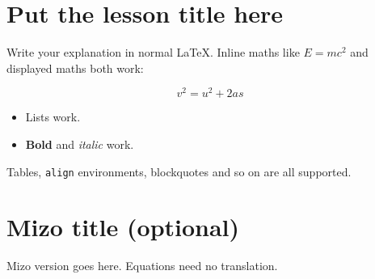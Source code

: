%
%
%
%
%

\section*{Put the lesson title here}

Write your explanation in normal LaTeX. Inline maths like $E = mc^{2}$ and
displayed maths both work:

\begin{equation}
  v^{2} = u^{2} + 2 a s
\end{equation}

\begin{itemize}
  \item Lists work.
  \item \textbf{Bold} and \emph{italic} work.
\end{itemize}

Tables, \texttt{align} environments, blockquotes and so on are all supported.


\section*{Mizo title (optional)}

Mizo version goes here. Equations need no translation.

